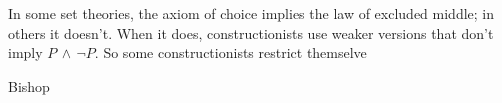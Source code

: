 In some set theories, the axiom of choice implies
the law of excluded middle; in others it doesn't.
When it does, constructionists use weaker versions
that don't imply $P \, \wedge \, \lnot P$.
So some constructionists restrict themselve

\label{sec:Measure_theory}

Bishop~\cite{bishop1967foundations,bishop1972constructive,bishop1985constructive}

\setcounter{currentlevel}{\value{currentlevel+1}}
 